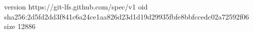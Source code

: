 version https://git-lfs.github.com/spec/v1
oid sha256:2d5fd2dd3f841c6a24ce1aa826d23d1d19d29935fbfe8bbfccedc02a72592f06
size 12886
